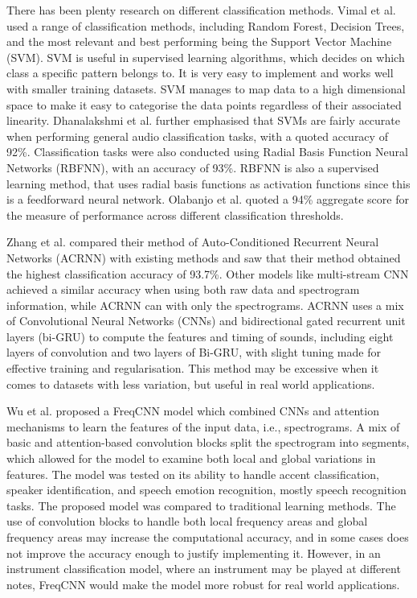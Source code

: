 \documentclass[class=report,11pt,crop=false]{standalone}
\begin{document}
There has been plenty research on different classification methods. Vimal et al. \cite{Vimal_2021} used a range of classification methods, including Random Forest, Decision Trees, and the most relevant and best performing being the Support Vector Machine (SVM). SVM is useful in supervised learning algorithms, which decides on which class a specific pattern belongs to. It is very easy to implement and works well with smaller training datasets. SVM manages to map data to a high dimensional space to make it easy to categorise the data points regardless of their associated linearity. Dhanalakshmi et al. \cite{Dhanalakshmi_2009} further emphasised that SVMs are fairly accurate when performing general audio classification tasks, with a quoted accuracy of 92\%. Classification tasks were also conducted using Radial Basis Function Neural Networks (RBFNN), with an accuracy of 93\%. RBFNN is also a supervised learning method, that uses radial basis functions as activation functions since this is a feedforward neural network. Olabanjo et al. \cite{Olabanjo_2022} quoted a 94\% aggregate score for the measure of performance across different classification thresholds. 

Zhang et al. \cite{Zhang2021} compared their method of Auto-Conditioned Recurrent Neural Networks (ACRNN) with existing methods and saw that their method obtained the highest classification accuracy of 93.7\%. Other models like multi-stream CNN achieved a similar accuracy when using both raw data and spectrogram information, while ACRNN can with only the spectrograms. ACRNN uses a mix of Convolutional Neural Networks (CNNs) and bidirectional gated recurrent unit layers (bi-GRU) to compute the features and timing of sounds, including eight layers of convolution and two layers of Bi-GRU, with slight tuning made for effective training and regularisation. This method may be excessive when it comes to datasets with less variation, but useful in real world applications. 

Wu et al. \cite{Wu_2018} proposed a FreqCNN model which combined CNNs and attention mechanisms to learn the features of the input data, i.e., spectrograms. A mix of basic and attention-based convolution blocks split the spectrogram into segments, which allowed for the model to examine both local and global variations in features. The model was tested on its ability to handle accent classification, speaker identification, and speech emotion recognition, mostly speech recognition tasks. The proposed model was compared to traditional learning methods. The use of convolution blocks to handle both local frequency areas and global frequency areas may increase the computational accuracy, and in some cases does not improve the accuracy enough to justify implementing it. However, in an instrument classification model, where an instrument may be played at different notes, FreqCNN would make the model more robust for real world applications. 
\end{document}
